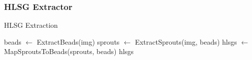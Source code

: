 \documentclass{sig-alternate}
\begin{document}
	\subsubsection{HLSG Extractor} %
	\label{ssub:HLSG Extractor}
		\begin{algorithm}[ht!]
			\caption{HLSG Extraction}
			\begin{algorithmic}
					\State beads $\gets$ ExtractBeads(img)
					\State sprouts $\gets$ ExtractSprouts(img, beads)
					\State hlsgs $\gets$ MapSproutsToBeads(sprouts, beads)
					\State \Return hlsgs
				\EndProcedure
			\end{algorithmic}
		\end{algorithm}
\end{document}
